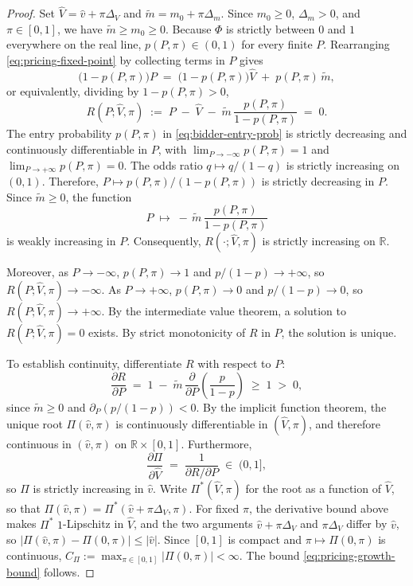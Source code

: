 \begin{proof}
Set $\hat V = \hat v + \pi\Delta_V$ and $\widetilde m = m_0 + \pi\Delta_m$. Since $m_0 \ge 0$, $\Delta_m > 0$, and $\pi \in [0, 1]$, we have $\widetilde m \ge m_0 \ge 0$. Because $\Phi$ is strictly between $0$ and $1$ everywhere on the real line, $p(P, \pi) \in (0, 1)$ for every finite $P$. Rearranging \eqref{eq:pricing-fixed-point} by collecting terms in $P$ gives
\[
\bigl(1 - p(P, \pi)\bigr) P \;=\; \bigl(1 - p(P, \pi)\bigr)\hat V \;+\; p(P, \pi)\,\widetilde m,
\]
or equivalently, dividing by $1 - p(P, \pi) > 0$,
\begin{equation}
\label{eq:pricing-root-residual}
R(P; \hat V, \pi) \;:=\; P \;-\; \hat V \;-\; \widetilde m\,\frac{p(P, \pi)}{1 - p(P, \pi)} \;=\; 0.
\end{equation}
The entry probability $p(P, \pi)$ in \eqref{eq:bidder-entry-prob} is strictly decreasing and continuously differentiable in $P$, with $\lim_{P \to -\infty} p(P, \pi) = 1$ and $\lim_{P \to +\infty} p(P, \pi) = 0$. The odds ratio $q \mapsto q / (1 - q)$ is strictly increasing on $(0, 1)$. Therefore, $P \mapsto p(P, \pi) / (1 - p(P, \pi))$ is strictly decreasing in $P$. Since $\widetilde m \ge 0$, the function
\[
P \;\longmapsto\; -\,\widetilde m\,\frac{p(P, \pi)}{1 - p(P, \pi)}
\]
is weakly increasing in $P$. Consequently, $R(\cdot; \hat V, \pi)$ is strictly increasing on $\mathbb{R}$.

Moreover, as $P \to -\infty$, $p(P, \pi) \to 1$ and $p/(1-p) \to +\infty$, so $R(P; \hat V, \pi) \to -\infty$. As $P \to +\infty$, $p(P, \pi) \to 0$ and $p/(1-p) \to 0$, so $R(P; \hat V, \pi) \to +\infty$. By the intermediate value theorem, a solution to $R(P; \hat V, \pi) = 0$ exists. By strict monotonicity of $R$ in $P$, the solution is unique.

To establish continuity, differentiate $R$ with respect to $P$:
\[
\frac{\partial R}{\partial P} \;=\; 1 \;-\; \widetilde m\,\frac{\partial}{\partial P}\left(\frac{p}{1-p}\right) \;\ge\; 1 \;>\; 0,
\]
since $\widetilde m \ge 0$ and $\partial_P (p/(1-p)) < 0$. By the implicit function theorem, the unique root $\Pi(\hat v, \pi)$ is continuously differentiable in $(\hat V, \pi)$, and therefore continuous in $(\hat v, \pi)$ on $\mathbb{R} \times [0, 1]$. Furthermore,
\[
\frac{\partial \Pi}{\partial \hat V} \;=\; \frac{1}{\partial R / \partial P} \;\in\; (0, 1],
\]
so $\Pi$ is strictly increasing in $\hat v$. Write $\Pi^\ast(\hat V, \pi)$ for the root as a function of $\hat V$, so that $\Pi(\hat v, \pi) = \Pi^\ast(\hat v + \pi\Delta_V, \pi)$. For fixed $\pi$, the derivative bound above makes $\Pi^\ast$ $1$-Lipschitz in $\hat V$, and the two arguments $\hat v + \pi\Delta_V$ and $\pi\Delta_V$ differ by $\hat v$, so $|\Pi(\hat v, \pi) - \Pi(0, \pi)| \le |\hat v|$. Since $[0, 1]$ is compact and $\pi \mapsto \Pi(0, \pi)$ is continuous, $C_\Pi := \max_{\pi \in [0, 1]} |\Pi(0, \pi)| < \infty$. The bound \eqref{eq:pricing-growth-bound} follows.
\end{proof}

